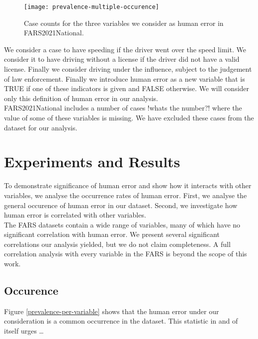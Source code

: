 \documentclass{article}
\theoremstyle{plain}
\theoremstyle{definition}
\theoremstyle{remark}
\begin{document}
\begin{figure}[ht]
	\vskip 0.2in
	\begin{center}
		\centerline{\texttt{[image: prevalence-multiple-occurence]}}
		\caption{Case counts for the three variables we consider as human error in FARS2021National.}
		\label{fig:err-case-counts}
	\end{center}
	\vskip -0.2in
\end{figure}

We consider a case to have speeding if the driver went over the speed limit. We consider it to have driving without a license if the driver did not have a valid license. Finally we consider driving under the influence, subject to the judgement of law enforcement. Finally we introduce human error as a new variable that is TRUE if one of these indicators is given and FALSE otherwise. We will consider only this definition of human error in our analysis.
\\
FARS2021National includes a number of cases !whats the number?! where the value of some of these variables is missing. We have excluded these cases from the dataset for our analysis.

\section{Experiments and Results}\label{sec:results}


To demonstrate significance of human error and show how it interacts with other variables, we analyse the occurrence rates of human error. First, we analyse the general occurence of human error in our dataset. Second, we investigate how human error is correlated with other variables.
\\
The FARS datasets contain a wide range of variables, many of which have no significant correlation with human error. We present several significant correlations our analysis yielded, but we do not claim completeness. A full correlation analysis with every variable in the FARS is beyond the scope of this work.

\subsection{Occurence}
Figure \ref{prevalence-per-variable} shows that the human error under our consideration is a common occurrence in the dataset. This statistic in and of itself urges \ldots
\end{document}
